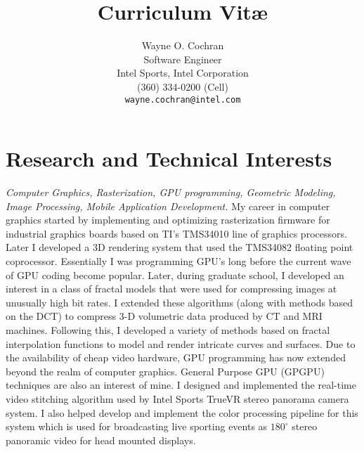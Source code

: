 \documentclass[10pt]{article}
\title{Curriculum Vit\ae}
\author{Wayne O. Cochran\\
       Software Engineer\\
       Intel Sports, Intel Corporation\\
       (360) 334-0200 (Cell) \\
       {\tt wayne.cochran@intel.com}}
\begin{document}
\maketitle




\section*{Research and Technical Interests}

{\em Computer Graphics, Rasterization, 
GPU programming, Geometric Modeling, Image Processing, Mobile Application Development.}
My career in computer graphics started by 
implementing and optimizing rasterization firmware
for industrial graphics boards based on
TI's TMS34010 line of graphics processors.
Later I developed a 3D rendering system
that used the TMS34082 floating  point coprocessor.
Essentially I was programming GPU's long before
the current wave of GPU coding become popular.
Later, during graduate school, I developed an interest
in a class of fractal models that were used for compressing
images at unusually high bit rates. I extended these
algorithms (along with methods based on the DCT)
to compress 3-D volumetric data produced by CT
and MRI machines. Following this, I developed a variety of methods
based on fractal interpolation functions to model
and render intricate curves and surfaces.
Due to the availability of cheap video hardware,
GPU programming
has now extended beyond the realm of computer graphics.
General Purpose GPU (GPGPU) techniques are also
an interest of mine.
I designed and implemented the real-time video stitching algorithm
used by Intel Sports TrueVR 
stereo panorama camera system. I also helped develop and implement
the color processing pipeline for this system
which is used for broadcasting live sporting events as $180^\circ$ stereo
panoramic video for head mounted displays.
\end{document}
